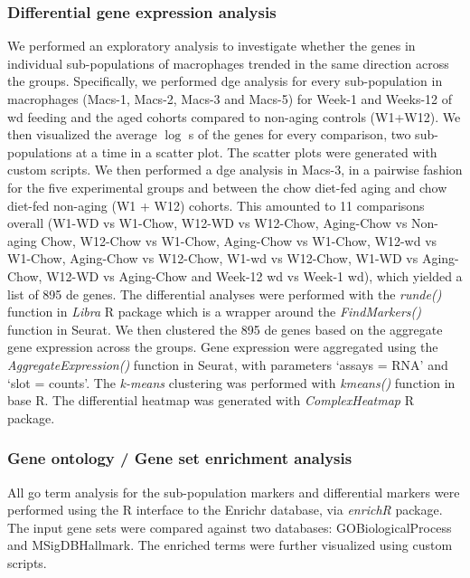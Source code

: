 \subsubsection{\large Differential gene expression analysis}
\label{subsubsec:met_chp2_dge}


We performed an exploratory analysis to investigate whether the genes in individual sub-populations of macrophages trended in the same direction across the groups. Specifically, we performed \gls{dge} analysis for every sub-population in macrophages (Macs-1, Macs-2, Macs-3 and Macs-5) for Week-1 and Weeks-12 of \gls{wd} feeding and the aged cohorts compared to non-aging controls (W1+W12). We then visualized the average $\log$ s of the genes for every comparison, two sub-populations at a time in a scatter plot. The scatter plots were generated with custom scripts. We then performed a \gls{dge} analysis in Macs-3, in a pairwise fashion for the five experimental groups and between the chow diet-fed aging and chow diet-fed non-aging (W1 + W12) cohorts. This amounted to 11 comparisons overall (W1-WD vs W1-Chow, W12-WD vs W12-Chow, Aging-Chow vs Non-aging Chow, W12-Chow vs W1-Chow, Aging-Chow vs W1-Chow, W12-\gls{wd} vs W1-Chow, Aging-Chow vs W12-Chow, W1-\gls{wd} vs W12-Chow, W1-WD vs Aging-Chow, W12-WD vs Aging-Chow and Week-12 \gls{wd} vs Week-1 \gls{wd}), which yielded a list of 895 \gls{de} genes. The differential analyses were performed with the \textit{run\textunderscore de()} function in \textit{Libra} R package \textbf{\cite{noauthor_libra_2024}} which is a wrapper around the \textit{FindMarkers()} function in Seurat. We then clustered the 895 \gls{de} genes based on the aggregate gene expression across the groups. Gene expression were aggregated using the \textit{AggregateExpression()} function in Seurat, with parameters `assays = RNA' and `slot = counts'. The \textit{k-means} clustering was performed with \textit{kmeans()} function in base R. The differential heatmap was generated with \textit{ComplexHeatmap} R package.


\subsubsection{\large Gene ontology / Gene set enrichment analysis}
\label{subsubsec:met_chp2_gogsea}
All \gls{go} term analysis for the sub-population markers and differential markers were performed using the R interface to the Enrichr database, via \textit{enrichR} package. The input gene sets were compared against two databases: GO\textunderscore Biological\textunderscore Process and MSigDB\textunderscore Hallmark. The enriched terms were further visualized using custom scripts.

